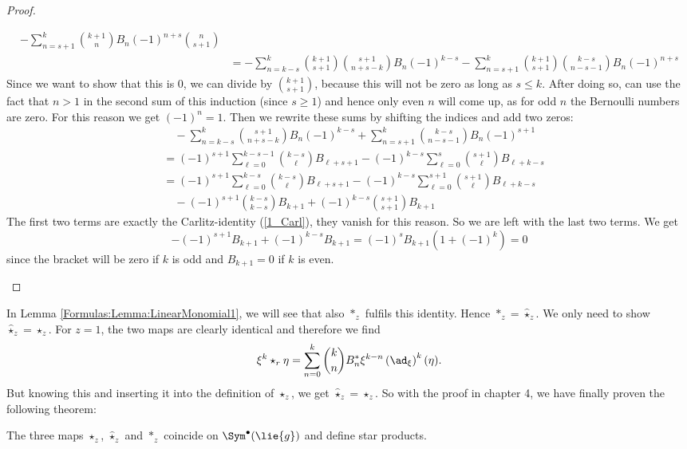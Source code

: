 \begin{proof}
\begin{subproof}
\begin{enumerate}[(i)]
\begin{align*}
				- \sum\limits_{n=s+1}^k
				\binom{k+1}{n} B_n (-1)^{n+s} \binom{n}{s+1} \\
				& = 
				- \sum\limits_{n=k-s}^k 
				\binom{k+1}{s+1} \binom{s+1}{n+s-k} B_n (-1)^{k-s}
				- \sum\limits_{n=s+1}^k
				\binom{k+1}{s+1} \binom{k-s}{n-s-1} B_n (-1)^{n+s}
			\end{align*}
			Since we want to show that this is $0$, we can divide by
			$\binom{k+1}{s+1}$, because this will not be zero as long as 
			$s\leq k$. After doing so, can use the fact that $n>1$ in the 
			second sum of this induction (since $s\geq 1$) and hence only even 
			$n$ will come up, as for odd $n$ the Bernoulli numbers are zero. 
			For this reason we get $(-1)^n = 1$. Then we rewrite these sums by 
			shifting the indices and add two zeros:
			\begin{align*}
				& \quad
				- \sum\limits_{n=k-s}^k
				\binom{s+1}{n+s-k} B_n (-1)^{k-s}
				+ \sum\limits_{n=s+1}^k
				\binom{k-s}{n-s-1} B_n (-1)^{s+1} \\
				& =
				(-1)^{s+1} \sum\limits_{\ell=0}^{k-s-1}
				\binom{k-s}{\ell} B_{\ell+s+1}
				- (-1)^{k-s}\sum\limits_{\ell=0}^s 
				\binom{s+1}{\ell} B_{\ell + k - s} \\
				& =
				(-1)^{s+1} \sum\limits_{\ell=0}^{k-s}
				\binom{k-s}{\ell} B_{\ell+s+1}
				- (-1)^{k-s} \sum\limits_{\ell=0}^{s+1}
				\binom{s+1}{\ell} B_{\ell + k - s}\\
				& \quad
				- (-1)^{s+1} \binom{k-s}{k-s} B_{k+1} 
				+ (-1)^{k-s} \binom{s+1}{s+1} B_{k+1}
			\end{align*}
			The first two terms are exactly the Carlitz-identity 
			(\ref{1_Carl}), they vanish for this reason. So we are left with 
			the last two terms. We get
			\begin{equation*}
				- (-1)^{s+1} B_{k+1} + (-1)^{k-s} B_{k+1}
				=
				(-1)^s B_{k+1} \left(1 + (-1)^k\right) = 0
			\end{equation*}
			since the bracket will be zero if $k$ is odd and $B_{k+1}=0$ if 
			$k$ is even.
		\end{enumerate}
	\end{subproof}
\end{proof}
In Lemma \ref{Formulas:Lemma:LinearMonomial1}, we will see that also	$\ast_z$ 
fulfils this identity. Hence $\ast_z = \widehat{\star}_z$. We only need to 
show $\widehat{\star}_z = \star_z$. For $z = 1$, the two 	maps are clearly 
identical and therefore we find
\begin{equation*}
	\xi^k \star_r \eta
	=
	\sum\limits_{n=0}^k
	\binom{k}{n} B_n^* \xi^{k-n}
	\left( \ad_{\xi} \right)^k(\eta).
\end{equation*}
But knowing this and inserting it into the definition of $\star_z$, we get 
$\widehat{\star}_z = \star_z$. So with the proof in chapter 4, we have finally 
proven the following theorem:
\begin{theorem}
	\label{Alg:Thm:ThreeStarsAreOne}
	The three maps $\star_z$, $\widehat{\star}_z$ and $\ast_z$ 
	coincide on $\Sym^{\bullet}(\lie{g})$ and define star products.
\end{theorem}

